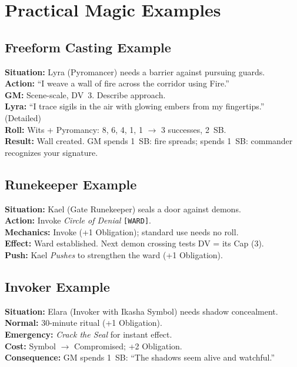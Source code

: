 \section{Practical Magic Examples}
\label{sec:magic-examples}

\subsection{Freeform Casting Example}
\label{subsec:freeform-example}
\textbf{Situation:} Lyra (Pyromancer) needs a barrier against pursuing guards.\\
\textbf{Action:} ``I weave a wall of fire across the corridor using Fire.''\\
\textbf{GM:} Scene-scale, DV~3. Describe approach.\\
\textbf{Lyra:} ``I trace sigils in the air with glowing embers from my fingertips.'' (Detailed)\\
\textbf{Roll:} Wits + Pyromancy: 8, 6, 4, 1, 1 $\rightarrow$ 3 successes, 2~SB.\\
\textbf{Result:} Wall created. GM spends 1~SB: fire spreads; spends 1~SB: commander recognizes your signature.

\subsection{Runekeeper Example}
\label{subsec:runekeeper-example}
\textbf{Situation:} Kael (Gate Runekeeper) seals a door against demons.\\
\textbf{Action:} Invoke \textit{Circle of Denial} \texttt{[WARD]}.\\
\textbf{Mechanics:} Invoke (+1 Obligation); standard use needs no roll.\\
\textbf{Effect:} Ward established. Next demon crossing tests DV = its Cap (3).\\
\textbf{Push:} Kael \textit{Pushes} to strengthen the ward (+1 Obligation).

\subsection{Invoker Example}
\label{subsec:invoker-example}
\textbf{Situation:} Elara (Invoker with Ikasha Symbol) needs shadow concealment.\\
\textbf{Normal:} 30-minute ritual (+1 Obligation).\\
\textbf{Emergency:} \textit{Crack the Seal} for instant effect.\\
\textbf{Cost:} Symbol $\rightarrow$ Compromised; +2 Obligation.\\
\textbf{Consequence:} GM spends 1~SB: ``The shadows seem alive and watchful.''

